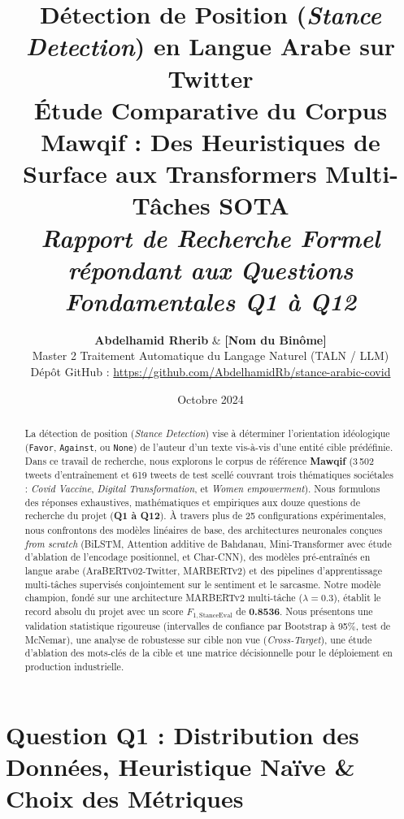 \documentclass[11pt,a4paper]{article}
\title{\vspace{-1.5cm}\Huge\textbf{\color{primaryblue}Détection de Position (\textit{Stance Detection}) en Langue Arabe sur Twitter}\\[0.3cm]
\Large\textbf{Étude Comparative du Corpus Mawqif : Des Heuristiques de Surface aux Transformers Multi-Tâches SOTA}\\[0.2cm]
\large\textit{Rapport de Recherche Formel répondant aux Questions Fondamentales Q1 à Q12}}
\author{\textbf{Abdelhamid Rherib} \quad \& \quad \textbf{[Nom du Binôme]}\\
Master 2 Traitement Automatique du Langage Naturel (TALN / LLM)\\
Dépôt GitHub : \url{https://github.com/AbdelhamidRb/stance-arabic-covid}}
\date{Octobre 2024}
\begin{document}
\maketitle

\begin{abstract}
La détection de position (\textit{Stance Detection}) vise à déterminer l'orientation idéologique (\texttt{Favor}, \texttt{Against}, ou \texttt{None}) de l'auteur d'un texte vis-à-vis d'une entité cible prédéfinie. Dans ce travail de recherche, nous explorons le corpus de référence \textbf{Mawqif} (3\,502 tweets d'entraînement et 619 tweets de test scellé couvrant trois thématiques sociétales : \textit{Covid Vaccine}, \textit{Digital Transformation}, et \textit{Women empowerment}). 
Nous formulons des réponses exhaustives, mathématiques et empiriques aux douze questions de recherche du projet (\textbf{Q1 à Q12}). À travers plus de 25 configurations expérimentales, nous confrontons des modèles linéaires de base, des architectures neuronales conçues \textit{from scratch} (BiLSTM, Attention additive de Bahdanau, Mini-Transformer avec étude d'ablation de l'encodage positionnel, et Char-CNN), des modèles pré-entraînés en langue arabe (AraBERTv02-Twitter, MARBERTv2) et des pipelines d'apprentissage multi-tâches supervisés conjointement sur le sentiment et le sarcasme. 
Notre modèle champion, fondé sur une architecture MARBERTv2 multi-tâche ($\lambda = 0.3$), établit le record absolu du projet avec un score $F_{1,\text{StanceEval}}$ de \textbf{0.8536}. Nous présentons une validation statistique rigoureuse (intervalles de confiance par Bootstrap à 95\%, test de McNemar), une analyse de robustesse sur cible non vue (\textit{Cross-Target}), une étude d'ablation des mots-clés de la cible et une matrice décisionnelle pour le déploiement en production industrielle.
\end{abstract}

\vspace{0.2cm}
\tableofcontents
\vspace{0.5cm}

\newpage

\section{Question Q1 : Distribution des Données, Heuristique Naïve \& Choix des Métriques}
\end{document}
